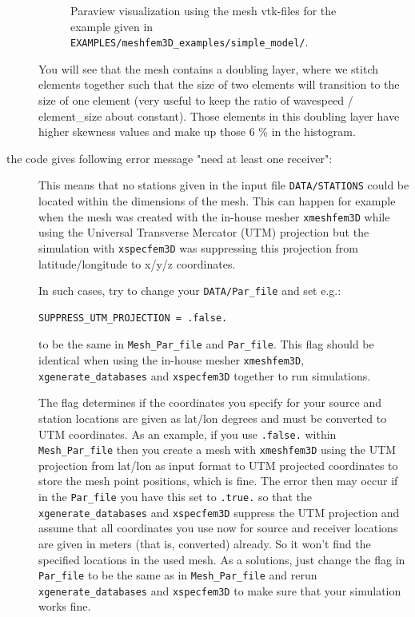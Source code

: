 \begin{description}
\begin{figure}[htbp]
\caption{Paraview visualization using the mesh vtk-files for the example given
in \texttt{EXAMPLES/meshfem3D\_examples/simple\_model/}.}


\label{fig:mesh.vp}
\end{figure}



You will see that the mesh contains a doubling layer, where we stitch
elements together such that the size of two elements will transition
to the size of one element (very useful to keep the ratio of wavespeed
/ element\_size about constant). Those elements in this doubling layer
have higher skewness values and make up those 6 \% in the histogram.\newline

\item [{the code gives following error message "need at least one receiver":}] This
means that no stations given in the input file \texttt{DATA/STATIONS}
could be located within the dimensions of the mesh. This can happen
for example when the mesh was created with the in-house mesher \texttt{xmeshfem3D}
while using the Universal Transverse Mercator (UTM) projection but
the simulation with \texttt{xspecfem3D} was suppressing this projection
from latitude/longitude to x/y/z coordinates.\newline


In such cases, try to change your \texttt{DATA/Par\_file} and set
e.g.:
\begin{verbatim}
SUPPRESS_UTM_PROJECTION = .false.
\end{verbatim}
to be the same in \texttt{Mesh\_Par\_file} and \texttt{Par\_file}.
This flag should be identical when using the in-house mesher \texttt{xmeshfem3D},
\texttt{xgenerate\_databases} and \texttt{xspecfem3D} together to
run simulations.\newline


The flag determines if the coordinates you specify for your source
and station locations are given as lat/lon degrees and must be converted
to UTM coordinates. As an example, if you use \texttt{.false.} within
\texttt{Mesh\_Par\_file} then you create a mesh with \texttt{xmeshfem3D}
using the UTM projection from lat/lon as input format to UTM projected
coordinates to store the mesh point positions, which is fine. The
error then may occur if in the \texttt{Par\_file} you have this set
to \texttt{.true.} so that the \texttt{xgenerate\_databases} and \texttt{xspecfem3D}
suppress the UTM projection and assume that all coordinates you use
now for source and receiver locations are given in meters (that is,
converted) already. So it won't find the specified locations in the
used mesh. As a solutions, just change the flag in \texttt{Par\_file}
to be the same as in \texttt{Mesh\_Par\_file} and rerun \texttt{xgenerate\_databases}
and \texttt{xspecfem3D} to make sure that your simulation works fine.\newline


\end{description}
